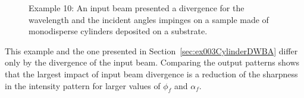 \begin{figure}[H]
\hfill
{}
\hfill
{}
\hfill
\caption{Example 10: An input beam presented a divergence for the wavelength and the incident angles impinges on a sample made of monodisperse cylinders deposited on a substrate.}
\label{fig:PythonEx10BeamDiv}
\end{figure}

This example and the one presented in Section~\ref{sec:ex003CylinderDWBA} differ only by the divergence of the input beam. Comparing the output patterns shows that the largest impact of input beam divergence is a reduction of the sharpness in the intensity pattern for larger values of $\phi_f$ and $\alpha_f$.\\




